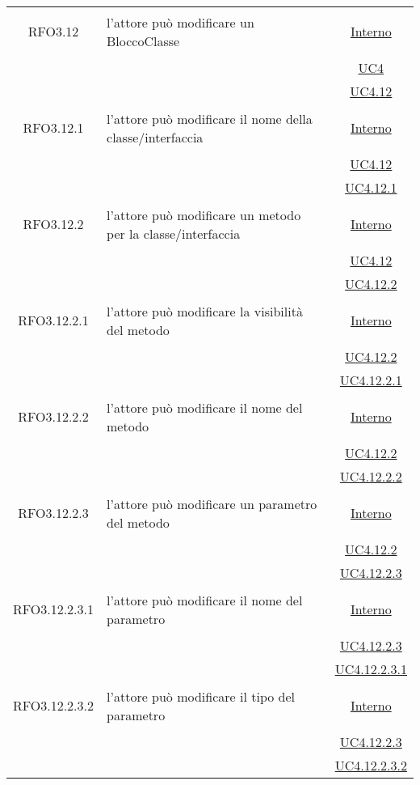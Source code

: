 \begin{longtable}{|c|>{\centering}m{7cm}|c|}
\hypertarget{RFO3.12}{RFO3.12} & l'attore può modificare un BloccoClasse &  \hyperlink{Interno}{Interno}\\
& &\hyperref[UC4]{UC4}\\
& &\hyperref[UC4.12]{UC4.12}\\ \hline

\hypertarget{RFO3.12.1}{RFO3.12.1} & l'attore può modificare il nome della classe/interfaccia & \hyperlink{Interno}{Interno}\\
& &\hyperref[UC4.12]{UC4.12}\\
& &\hyperref[UC4.12.1]{UC4.12.1}\\ \hline

\hypertarget{RFO3.12.2}{RFO3.12.2} & l'attore può modificare un metodo per la classe/interfaccia & \hyperlink{Interno}{Interno}\\
& &\hyperref[UC4.12]{UC4.12}\\
& &\hyperref[UC4.12.2]{UC4.12.2}\\ \hline

\hypertarget{RFO3.12.2.1}{RFO3.12.2.1} & l'attore può modificare la visibilità del metodo & \hyperlink{Interno}{Interno}\\
& &\hyperref[UC4.12.2]{UC4.12.2}\\
& &\hyperref[UC4.12.2.1]{UC4.12.2.1}\\ \hline

\hypertarget{RFO3.12.2.2}{RFO3.12.2.2} & l'attore può modificare il nome del metodo & \hyperlink{Interno}{Interno}\\
& &\hyperref[UC4.12.2]{UC4.12.2}\\
& &\hyperref[UC4.12.2.2]{UC4.12.2.2}\\ \hline

\hypertarget{RFO3.12.2.3}{RFO3.12.2.3} & l'attore può modificare un parametro del metodo & \hyperlink{Interno}{Interno}\\
& &\hyperref[UC4.12.2]{UC4.12.2}\\
& &\hyperref[UC4.12.2.3]{UC4.12.2.3}\\ \hline

\hypertarget{RFO3.12.2.3.1}{RFO3.12.2.3.1} & l'attore può modificare il nome del parametro & \hyperlink{Interno}{Interno}\\
& &\hyperref[UC4.12.2.3]{UC4.12.2.3}\\
& &\hyperref[UC4.12.2.3.1]{UC4.12.2.3.1}\\ \hline

\hypertarget{RFO3.12.2.3.2}{RFO3.12.2.3.2} & l'attore può modificare il tipo del parametro & \hyperlink{Interno}{Interno}\\
& &\hyperref[UC4.12.2.3]{UC4.12.2.3}\\
& &\hyperref[UC4.12.2.3.2]{UC4.12.2.3.2}\\ \hline


\end{longtable}
